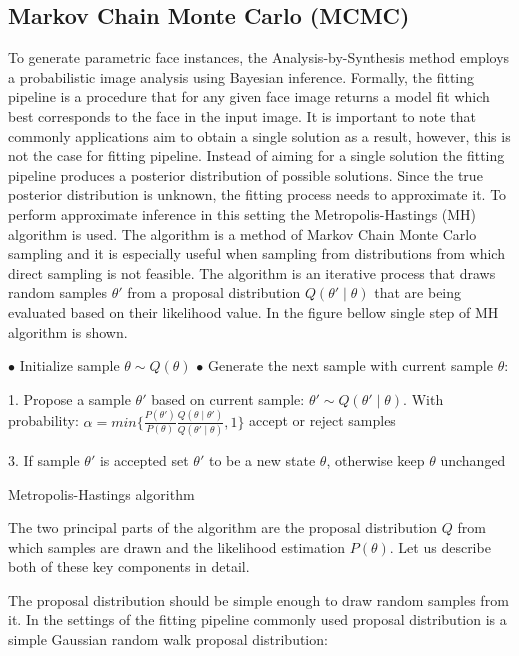 \subsection{Markov Chain Monte Carlo (MCMC)}\label{s2.2.1}
To generate parametric face instances, the Analysis-by-Synthesis method employs a probabilistic image analysis using Bayesian inference. Formally, the fitting pipeline is a procedure that for any given face image returns a model fit which best corresponds to the face in the input image. It is important to note that commonly applications aim to obtain a single solution as a result, however, this is not the case for fitting pipeline. Instead of aiming for a single solution the fitting pipeline produces a posterior distribution of possible solutions. Since the true posterior distribution is unknown, the fitting process needs to approximate it. To perform approximate inference in this setting the Metropolis-Hastings (MH) algorithm is used. The algorithm is a method of Markov Chain Monte Carlo sampling and it is especially useful when sampling from distributions from which direct sampling is not feasible. The algorithm is an iterative process that draws random samples $\theta'$ from a proposal distribution $Q(\theta'\mid\theta)$ that are being evaluated based on their likelihood value. In the figure bellow single step of MH algorithm is shown.\bigskip

\begin{algorithm}[H]
    \SetAlgoLined
     $\bullet$ Initialize sample $\theta \sim Q(\theta)$\;
     $\bullet$ Generate the next sample with current sample $\theta$:\\
     {\addtolength{\leftskip}{5mm}
     1. Propose a sample $\theta'$ based on current sample: $\theta'\sim Q(\theta'\mid\theta)$. With probability: $\alpha = min\Big\lbrace\frac{P(\theta')}{P(\theta)}\frac{Q(\theta\mid\theta')}{Q(\theta'\mid\theta)}, 1\Big\rbrace$ accept or reject samples\;

      3. If sample $\theta'$ is accepted set $\theta'$ to be a new state $\theta$, otherwise keep $\theta$ unchanged\; 
     }
     \caption{Metropolis-Hastings algorithm}
     \label{a1}
\end{algorithm}\bigskip

The two principal parts of the algorithm are the proposal distribution $Q$ from which samples are drawn and the likelihood estimation $P(\theta)$. Let us describe both of these key components in detail.  \bigskip

The proposal distribution should be simple enough to draw random samples from it. In the settings of the fitting pipeline commonly used proposal distribution is a simple Gaussian random walk proposal distribution: 

